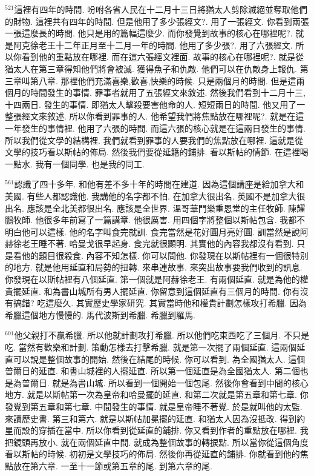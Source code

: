 \documentclass{book}
\begin{document}
$^{521}$這裡有四年的時間.
吩咐各省人民在十二月十三日將猶太人剪除滅絕並奪取他們的財物.
這裡共有四年的時間.
但是他用了多少張經文?.
用了一張經文.
你看到兩張一張這麼長的時間.
他只是用的篇幅這麼少.
而你發覺到故事的核心在哪裡呢?.
就是阿克徐老王十二年正月至十二月一年的時間.
他用了多少張?.
用了六張經文.
所以你看到他的重點放在哪裡.
而在這六張經文裡面.
故事的核心在哪裡呢?.
就是從猶太人在第三章得知他們將會被滅.
獲得魚子和仇敵.
他們可以在仇敵身上報仇.
第三章叫第八章.
那裡他們充滿喜樂,歡喜,快樂的時候.
只是兩個月的時間.
但是這兩個月的時間發生的事情.
罪事者就用了五張經文來敘述.
然後我們看到十二月十三,十四兩日.
發生的事情.
即猶太人擊殺要害他命的人.
短短兩日的時間.
他又用了一整張經文來敘述.
所以你看到罪事的人.
他希望我們將焦點放在哪裡呢?.
就是在這一年發生的事情裡.
他用了六張的時間.
而這六張的核心就是在這兩日發生的事情.
所以我們從文學的結構裡.
我們就看到罪事的人要我們的焦點放在哪裡.
這就是從文學的技巧看以斯帖的佈局.
然後我們要從延籍的鋪排.
看以斯帖的情節.
在這裡喝一點水.
我有一個同學.
也是我的同工.

$^{561}$認識了四十多年.
和他有差不多十年的時間在建道.
因為這個講座是給加拿大和美國.
有些人都認識他.
我講他的名字都不怕.
在加拿大很出名.
英國不是加拿大很出名.
應該是全北美都很出名.
應該是全世界.
溫哥華門樂重恩堂的主任牧師.
陳耀鵬牧師.
他很多年前寫了一篇講章.
他很厲害.
用四個字將整個以斯帖包含.
我都不明白他可以這樣.
他的名字叫食完就訓.
食完當然是花好圓月亮好圓.
訓當然是說阿赫徐老王睡不著.
哈曼戈很早起身.
食完就很顯明.
其實他的內容我都沒有看到.
只是看他的題目很殺食.
內容不知怎樣.
你可以問他.
你發現在以斯帖裡有一個很特別的地方.
就是他用延直和局勢的扭轉.
來串連故事.
來突出故事要我們收到的訊息.
你發現在以斯帖裡有八個延直.
第一個就是阿赫徐老王.
有兩個延直.
就是為他的權貴擺延直.
和為書山城所有男人擺延直.
你留意到這個延直有三個月的時間.
你有沒有搞錯? 吃這麼久.
其實歷史學家研究.
其實當時他和權貴計劃怎樣攻打希臘.
因為希臘這個地方慢慢的.
馬代波斯到希臘.
希臘到羅馬.

$^{601}$他父親打不贏希臘.
所以他就計劃攻打希臘.
所以他們吃東西吃了三個月.
不只是吃.
當然有歡樂和計劃.
策動怎樣去打擊希臘.
就是第一次擺了兩個延直.
這兩個延直可以說是整個故事的開始.
然後在結尾的時候.
你可以看到.
為全國猶太人.
這個普爾日的延直.
和書山城裡的人擺延直.
所以第一個延直是為全國猶太人.
第二個也是為普爾日.
就是為書山城.
所以看到一個開始一個包尾.
然後你會看到中間的核心地方.
就是以斯帖第一次為皇帝和哈曼擺的延直.
和第二次就是第五章和第七章.
你發覺到第五章和第七章.
中間發生的事情.
就是皇帝睡不著覺.
於是就叫他的太監.
來讀歷史書.
第三和第六.
就是以斯帖加冕擺的延直.
和猶太人因為沒抵改.
得到約星而設的穿插在當中.
所以你看到從延直的鋪排.
你又看到作者的重點放在哪裡.
我把鏡頭再放小.
就在兩個延直中間.
就成為整個故事的轉捩點.
所以當你從這個角度看以斯帖的時候.
初初是文學技巧的佈局.
然後你再從延直的鋪排.
你就看到他的焦點放在第六章.
一至十一節或第五章的尾.
到第六章的尾.
\end{document}
